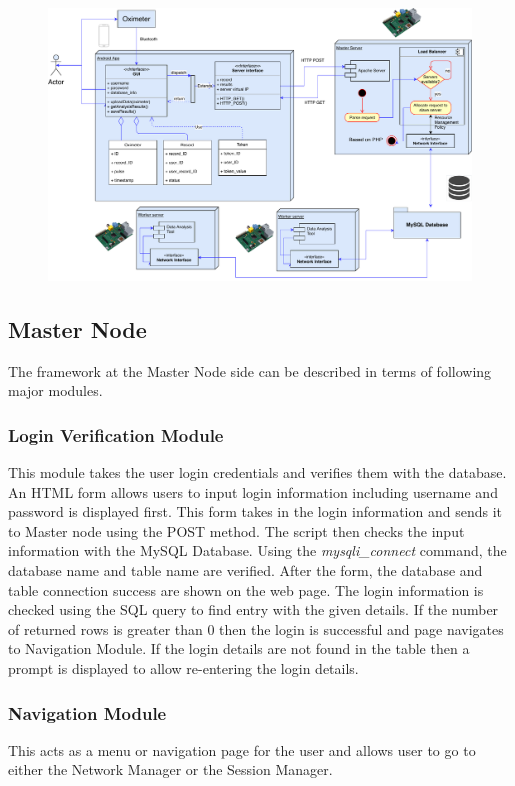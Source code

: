\documentclass[AMA,STIX1COL]{WileyNJD-v2}
\begin{document}
\begin{figure}[h]
\centering
\includegraphics[width=\textwidth]{model-with-interface}
\end{figure}

\subsection{Master Node}

The framework at the Master Node side can be described in terms of following major modules.

\subsubsection{Login Verification Module}
This module takes the user login credentials and verifies them with the database. An HTML form allows users to input login information including username and password is displayed first. This form takes in the login information and sends it to Master node using the POST method. The script then checks the input information with the MySQL Database. Using the \textit{mysqli\_connect} command, the database name and table name are verified. After the form, the database and table connection success are shown on the web page. 
The login information is checked using the SQL query to find entry with the given details. If the number of returned rows is greater than 0 then the login is successful and page navigates to Navigation Module. If the login details are not found in the table then a prompt is displayed to allow re-entering the login details. 

\subsubsection{Navigation Module}
This acts as a menu or navigation page for the user and allows user to go to either the Network Manager or the Session Manager.
\end{document}
